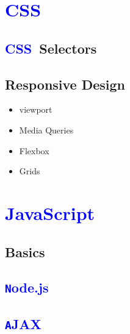 \documentclass{amsart}
\newcommand{\css}{\textcolor{blue}{{\ttfamily CSS}}}
\newcommand{\javascript}{\textcolor{blue}{{\ttfamily JavaScript}}}
\begin{document}
\section{\css}

\subsection{\css\ Selectors}

\subsection{Responsive Design}

\begin{itemize}
	\item viewport
	\item Media Queries
	\item Flexbox
	\item Grids
\end{itemize}


\section{\javascript}
\subsection{Basics}
\subsection{\textcolor{blue}{\texttt Node.js}}
\subsection{\textcolor{blue}{\texttt AJAX}}
\end{document}
